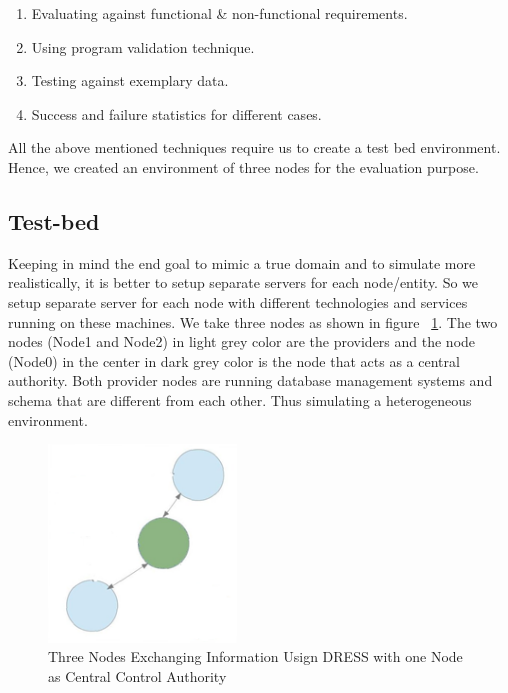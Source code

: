 \documentclass[12pt,a4paper,oneside]{book}
\begin{document}
	\begin{enumerate}

	\item Evaluating against functional \& non-functional requirements.

	\item Using program validation technique.
	
	\item Testing against exemplary data.
	
	\item Success and failure statistics for different cases.	

	\end{enumerate}
	
	All the above mentioned techniques require us to create a test bed environment. Hence, we created an environment of three nodes for the evaluation purpose. \\
	
	\subsection{Test-bed}
	Keeping in mind the end goal to mimic a true domain and to simulate more realistically, it is better to setup separate servers for each node/entity. So we setup separate server for each node with different technologies and services running on these machines. We take three nodes as shown in figure ~\ref{fig:testbed}. The two nodes (Node1 and Node2) in light grey color are the providers and the node (Node0) in the center in dark grey color is the node that acts as a central authority. Both provider nodes are running database management systems and schema that are different from each other. Thus simulating a heterogeneous environment.
	
\begin{figure}[!htp]
  \centering
  \includegraphics[width=5cm]{architecture_distributed_testbed_exchange_through_hec.png}
  \caption{Three Nodes Exchanging Information Usign DRESS with one Node as Central Control Authority}
  \label{fig:testbed}
\end{figure}  
\end{document}
